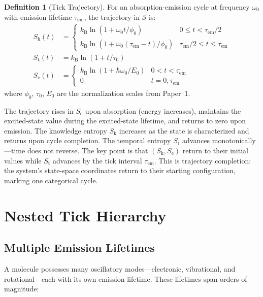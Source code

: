 \documentclass[11pt,a4paper]{article}
\theoremstyle{definition}
\newtheorem{definition}[theorem]{Definition}
\theoremstyle{remark}
\newcommand{\kB}{k_{\mathrm{B}}}
\newcommand{\Sk}{S_{\mathrm{k}}}
\newcommand{\St}{S_{\mathrm{t}}}
\newcommand{\Se}{S_{\mathrm{e}}}
\newcommand{\Sspace}{\mathcal{S}}
\newcommand{\tem}{\tau_{\mathrm{em}}}
\begin{document}
\begin{definition}[Tick Trajectory]
\label{def:tick_trajectory}
For an absorption-emission cycle at frequency $\omega_0$ with emission lifetime $\tem$, the trajectory in $\Sspace$ is:
\begin{align}
\Sk(t) &= \begin{cases} \kB \ln(1 + \omega_0 t / \phi_0) & 0 \leq t < \tem/2 \\ \kB \ln(1 + \omega_0 (\tem - t)/\phi_0) & \tem/2 \leq t \leq \tem \end{cases} \label{eq:sk_trajectory} \\
\St(t) &= \kB \ln(1 + t/\tau_0) \label{eq:st_trajectory} \\
\Se(t) &= \begin{cases} \kB \ln(1 + \hbar\omega_0/E_0) & 0 < t < \tem \\ 0 & t = 0, \tem \end{cases} \label{eq:se_trajectory}
\end{align}
where $\phi_0$, $\tau_0$, $E_0$ are the normalization scales from Paper~1.
\end{definition}

The trajectory rises in $\Se$ upon absorption (energy increases), maintains the excited-state value during the excited-state lifetime, and returns to zero upon emission. The knowledge entropy $\Sk$ increases as the state is characterized and returns upon cycle completion. The temporal entropy $\St$ advances monotonically---time does not reverse. The key point is that $(\Sk, \Se)$ return to their initial values while $\St$ advances by the tick interval $\tem$. This is trajectory completion: the system's state-space coordinates return to their starting configuration, marking one categorical cycle.

\section{Nested Tick Hierarchy}
\label{sec:hierarchy}

\subsection{Multiple Emission Lifetimes}

A molecule possesses many oscillatory modes---electronic, vibrational, and rotational---each with its own emission lifetime. These lifetimes span orders of magnitude:
\end{document}
